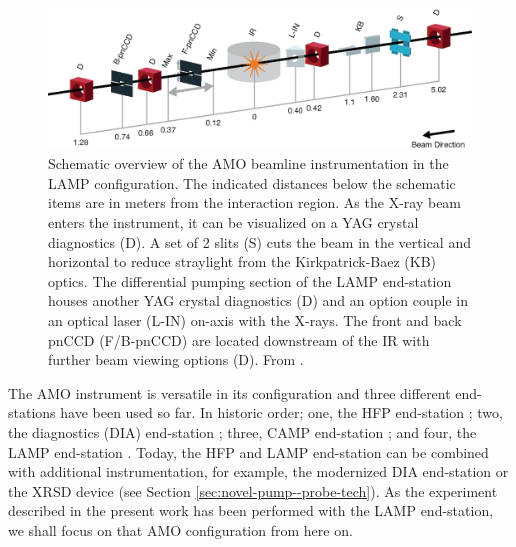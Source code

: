 \begin{figure}
	\centering
		\includegraphics[width=1.00\textwidth]{images/beam_layout.eps}
	\caption[Schematic overview of the AMO beamline instrumentation.]{Schematic overview of the AMO beamline instrumentation in the LAMP configuration. The indicated distances below the schematic items are in meters from the interaction region. As the X-ray beam enters the instrument, it can be visualized on a YAG crystal diagnostics (D). A set of 2 slits (S) cuts the beam in the vertical and horizontal to reduce straylight from the Kirkpatrick-Baez (KB) optics. The differential pumping section of the LAMP end-station houses another YAG crystal diagnostics (D) and an option couple in an optical laser (L-IN) on-axis with the X-rays. The front and back pnCCD (F/B-pnCCD) are located downstream of the IR with further beam viewing options (D). From \citep{Ferguson-2015-JSR}.}
	\label{fig:beam_layout}
\end{figure}
The AMO instrument is versatile in its configuration and three different end-stations have been used so far. In historic order; one, the HFP end-station \citep{Bozek-2009-EPJST,Bostedt-2013-JPB}; two, the diagnostics (DIA) end-station \citep{Bostedt-2013-JPB}; three, CAMP end-station \citep{Strueder-2010-NIMPA}; and four, the LAMP end-station \citep{Ferguson-2015-JSR,Bucher-2016-Unpublished}. Today, the HFP and LAMP end-station can be combined with additional instrumentation, for example, the modernized DIA end-station or the XRSD device (see Section \ref{sec:novel-pump--probe-tech}). As the experiment described in the present work has been performed with the LAMP end-station, we shall focus on that AMO configuration from here on.\\[1\baselineskip]
%
